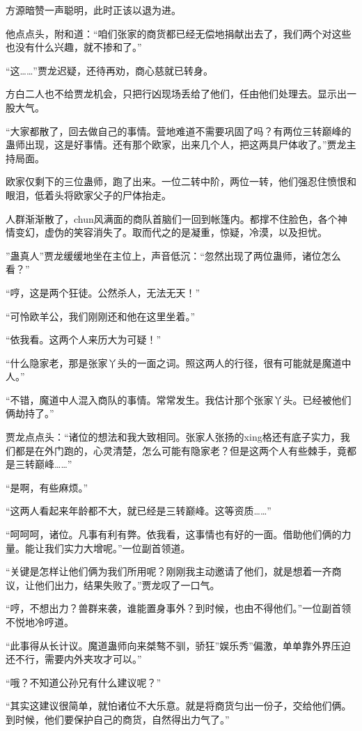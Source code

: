 \begin{this_body}
方源暗赞一声聪明，此时正该以退为进。

他点点头，附和道：“咱们张家的商货都已经无偿地捐献出去了，我们两个对这些也没有什么兴趣，就不掺和了。”

“这……”贾龙迟疑，还待再劝，商心慈就已转身。

方白二人也不给贾龙机会，只把行凶现场丢给了他们，任由他们处理去。显示出一股大气。

“大家都散了，回去做自己的事情。营地难道不需要巩固了吗？有两位三转巅峰的蛊师出现，这是好事情。还有那个欧家，出来几个人，把这两具尸体收了。”贾龙主持局面。

欧家仅剩下的三位蛊师，跑了出来。一位二转中阶，两位一转，他们强忍住愤恨和眼泪，低着头将欧家父子的尸体抬走。

人群渐渐散了，chun风满面的商队首脑们一回到帐篷内。都撑不住脸色，各个神情变幻，虚伪的笑容消失了。取而代之的是凝重，惊疑，冷漠，以及担忧。

”蛊真人”贾龙缓缓地坐在主位上，声音低沉：“忽然出现了两位蛊师，诸位怎么看？”

“哼，这是两个狂徒。公然杀人，无法无天！”

“可怜欧羊公，我们刚刚还和他在这里坐着。”

“依我看。这两个人来历大为可疑！”

“什么隐家老，那是张家丫头的一面之词。照这两人的行径，很有可能就是魔道中人。”

“不错，魔道中人混入商队的事情。常常发生。我估计那个张家丫头。已经被他们俩劫持了。”

贾龙点点头：“诸位的想法和我大致相同。张家人张扬的xing格还有底子实力，我们都是在外门跑的，心灵清楚，怎么可能有隐家老？但是这两个人有些棘手，竟都是三转巅峰……”

“是啊，有些麻烦。”

“这两人看起来年龄都不大，就已经是三转巅峰。这等资质……”

“呵呵呵，诸位。凡事有利有弊。依我看，这事情也有好的一面。借助他们俩的力量。能让我们实力大增呢。”一位副首领道。

“关键是怎样让他们俩为我们所用呢？刚刚我主动邀请了他们，就是想着一齐商议，让他们出力，结果失败了。”贾龙叹了一口气。

“哼，不想出力？兽群来袭，谁能置身事外？到时候，也由不得他们。”一位副首领不悦地冷哼道。

“此事得从长计议。魔道蛊师向来桀骜不驯，骄狂”娱乐秀”偏激，单单靠外界压迫还不行，需要内外夹攻才可以。”

“哦？不知道公孙兄有什么建议呢？”

“其实这建议很简单，就怕诸位不大乐意。就是将商货匀出一份子，交给他们俩。到时候，他们要保护自己的商货，自然得出力气了。”


\end{this_body}
